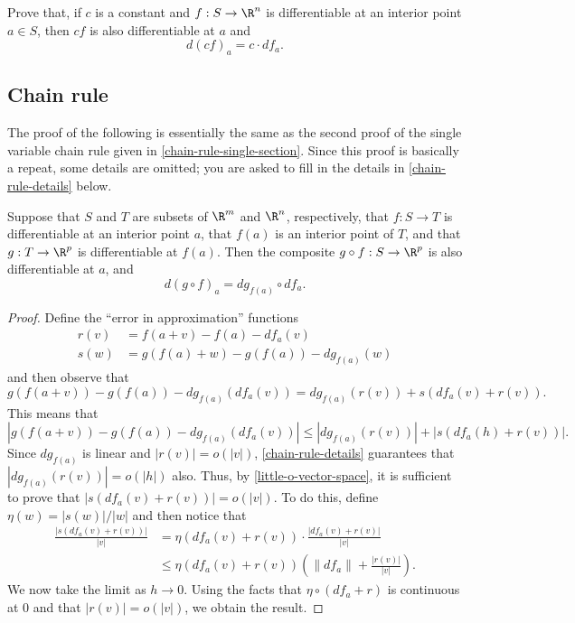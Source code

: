 \begin{exercise} \label{scalar-multiples-rule}
	Prove that, if $c$ is a constant and $f : S \to \R^n$ is differentiable at an interior point $a \in S$, then $cf$ is also differentiable at $a$ and \[ d(cf)_a = c \cdot df_a. \]
\end{exercise}

\subsection{Chain rule}

The proof of the following is essentially the same as the second proof of the single variable chain rule given in \cref{chain-rule-single-section}. Since this proof is basically a repeat, some details are omitted; you are asked to fill in the details in \cref{chain-rule-details} below. 

\begin{theorem} \label{chain-rule}
	Suppose that $S$ and $T$ are subsets of $\R^m$ and $\R^n$, respectively, that $f : S \to T$ is differentiable at an interior point $a$, that $f(a)$ is an interior point of $T$, and that $g : T \to \R^p$ is differentiable at $f(a)$. Then the composite $g \circ f : S \to \R^p$ is also differentiable at $a$, and 
	\[ d(g \circ f)_a = dg_{f(a)} \circ df_a. \]
\end{theorem}

\begin{proof}
	Define the ``error in approximation'' functions
	\[ \begin{aligned} 
	r(v) &= f(a+v)-f(a) - df_a(v) \\ 
	s(w) &= g(f(a)+w)-g(f(a))-dg_{f(a)}(w) 
	\end{aligned} \]
	and then observe that
	\begin{equation} \label{rewrite-error} g(f(a+v)) - g(f(a)) - dg_{f(a)}(df_a(v)) = dg_{f(a)}(r(v)) + s(df_a(v)+r(v)). \end{equation}
	This means that 
	\[ |g(f(a+v)) - g(f(a)) - dg_{f(a)}(df_a(v))| \leq |dg_{f(a)}(r(v))| + |s(df_a(h)+r(v))|. \]
	Since $dg_{f(a)}$ is linear and $|r(v)| = o(|v|)$, \cref{chain-rule-details} guarantees that $|dg_{f(a)}(r(v))| = o(|h|)$ also. Thus, by \cref{little-o-vector-space}, it is sufficient to prove that $|s(df_a(v) + r(v))| = o(|v|)$. To do this, define $\eta(w) = |s(w)|/|w|$ and then notice that 
	\[ \begin{aligned} \frac{|s(df_a(v)+r(v))|}{|v|} &= \eta(df_a(v)+r(v)) \cdot \frac{|df_a(v) + r(v)|}{|v|} \\
	&\leq \eta(df_a(v) + r(v)) \left( \|df_a\| + \frac{|r(v)|}{|v|} \right). \end{aligned} \]
	We now take the limit as $h \to 0$. Using the facts that $\eta \circ (df_a + r)$ is continuous at 0 and that $|r(v)| = o(|v|)$, we obtain the result. 
\end{proof}


